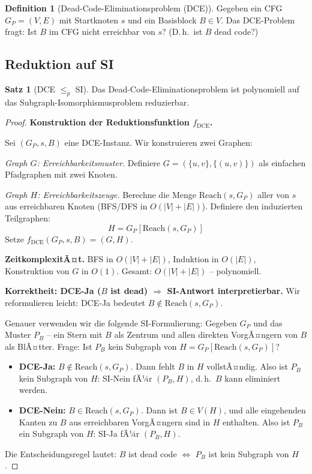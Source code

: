 ﻿\documentclass[a4paper,12pt]{article}
\theoremstyle{definition}
\newtheorem{definition}{Definition}
\newtheorem{satz}{Satz}
\begin{document}
\begin{definition}[Dead-Code-Eliminationsproblem (DCE)]
\label{def:dce}
Gegeben ein CFG $G_P = (V, E)$ mit Startknoten $s$ und ein Basisblock $B \in V$. Das DCE-Problem fragt: Ist $B$ im CFG nicht erreichbar von $s$? (D.\,h.\ ist $B$ dead code?)
\end{definition}

\subsection{Reduktion auf SI}

\begin{satz}[DCE $\leq_p$ SI]
\label{satz:dce-si}
Das Dead-Code-Eliminationsproblem ist polynomiell auf das Subgraph-Isomorphismusproblem reduzierbar.
\end{satz}

\begin{proof}
\textbf{Konstruktion der Reduktionsfunktion $f_{\text{DCE}}$.}

Sei $(G_P, s, B)$ eine DCE-Instanz. Wir konstruieren zwei Graphen:

\textit{Graph $G$: Erreichbarkeitsmuster.}
Definiere $G = (\{u, v\}, \{(u, v)\})$ als einfachen Pfadgraphen mit zwei Knoten.

\textit{Graph $H$: Erreichbarkeitszeuge.}
Berechne die Menge $\text{Reach}(s, G_P)$ aller von $s$ aus erreichbaren Knoten (BFS/DFS in $O(|V| + |E|)$). Definiere den induzierten Teilgraphen:
\[
H = G_P[\text{Reach}(s, G_P)]
\]
Setze $f_{\text{DCE}}(G_P, s, B) = (G, H)$.

\textbf{ZeitkomplexitÃ¤t.}
BFS in $O(|V| + |E|)$, Induktion in $O(|E|)$, Konstruktion von $G$ in $O(1)$. Gesamt: $O(|V| + |E|)$ -- polynomiell.

\textbf{Korrektheit: DCE-Ja ($B$ ist dead) $\Rightarrow$ SI-Antwort interpretierbar.}
Wir reformulieren leicht: DCE-Ja bedeutet $B \notin \text{Reach}(s, G_P)$.

Genauer verwenden wir die folgende SI-Formulierung: Gegeben $G_P$ und das Muster $P_B$ -- ein Stern mit $B$ als Zentrum und allen direkten VorgÃ¤ngern von $B$ als BlÃ¤tter. Frage: Ist $P_B$ kein Subgraph von $H = G_P[\text{Reach}(s, G_P)]$?

\begin{itemize}
    \item \textbf{DCE-Ja:} $B \notin \text{Reach}(s, G_P)$. Dann fehlt $B$ in $H$ vollstÃ¤ndig. Also ist $P_B$ kein Subgraph von $H$: SI-Nein fÃ¼r $(P_B, H)$, d.\,h.\ $B$ kann eliminiert werden.
    \item \textbf{DCE-Nein:} $B \in \text{Reach}(s, G_P)$. Dann ist $B \in V(H)$, und alle eingehenden Kanten zu $B$ aus erreichbaren VorgÃ¤ngern sind in $H$ enthalten. Also ist $P_B$ ein Subgraph von $H$: SI-Ja fÃ¼r $(P_B, H)$.
\end{itemize}

Die Entscheidungsregel lautet: $B$ ist dead code $\Leftrightarrow$ $P_B$ ist kein Subgraph von $H$.
\end{proof}
\end{document}
